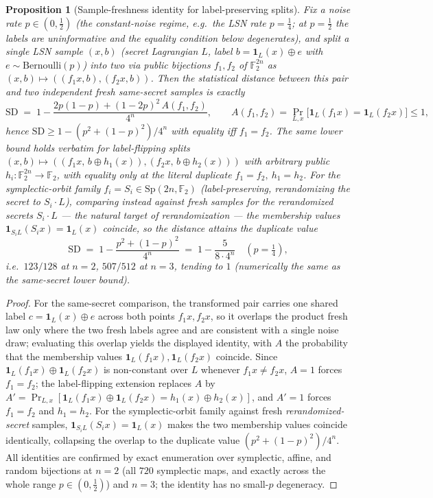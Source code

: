 \documentclass[11pt,a4paper]{article}
\theoremstyle{plain}
\newtheorem{proposition}[theorem]{Proposition}
\theoremstyle{definition}
\newcommand{\F}{\mathbb{F}}
\begin{document}
\begin{proposition}[Sample-freshness identity for label-preserving splits]
\label{prop:freshness}
Fix a noise rate $p \in (0,\tfrac12)$ (the constant-noise regime, e.g.\ the LSN rate $p=\tfrac14$; at $p=\tfrac12$ the labels are uninformative and the equality condition below degenerates), and split a single LSN sample $(x,b)$ (secret Lagrangian $L$, label $b = \mathbf 1_L(x)\oplus e$ with $e \sim \mathrm{Bernoulli}(p)$) into two via public bijections $f_1, f_2$ of $\F_2^{2n}$ as $(x,b)\mapsto((f_1 x, b),(f_2 x, b))$. Then the statistical distance between this pair and two independent fresh same-secret samples is exactly
\[
\mathrm{SD} \;=\; 1 - \frac{2p(1-p) + (1-2p)^2\,A(f_1,f_2)}{4^{n}},
\qquad A(f_1,f_2) = \Pr_{L,x}\bigl[\mathbf 1_L(f_1 x) = \mathbf 1_L(f_2 x)\bigr] \le 1,
\]
hence $\mathrm{SD} \ge 1 - (p^2+(1-p)^2)/4^n$ with equality iff $f_1 = f_2$. The same lower bound holds verbatim for label-flipping splits $(x,b)\mapsto((f_1 x,\,b\oplus h_1(x)),(f_2 x,\,b\oplus h_2(x)))$ with arbitrary public $h_i:\F_2^{2n}\to\F_2$, with equality only at the literal duplicate $f_1=f_2,\ h_1=h_2$. For the symplectic-orbit family $f_i = S_i \in \mathrm{Sp}(2n,\F_2)$ (label-preserving, rerandomizing the secret to $S_i\cdot L$), comparing instead against fresh samples \emph{for the rerandomized secrets} $S_i\cdot L$ --- the natural target of rerandomization --- the membership values $\mathbf 1_{S_iL}(S_ix)=\mathbf 1_L(x)$ coincide, so the distance attains the duplicate value
\[
\mathrm{SD} \;=\; 1 - \frac{p^2+(1-p)^2}{4^{n}} \;=\; 1 - \frac{5}{8\cdot 4^{n}} \quad (p = \tfrac14),
\]
i.e.\ $123/128$ at $n=2$, $507/512$ at $n=3$, tending to $1$ (numerically the same as the same-secret lower bound).
\end{proposition}

\begin{proof}
For the same-secret comparison, the transformed pair carries one shared label $c=\mathbf 1_L(x)\oplus e$ across both points $f_1x,f_2x$, so it overlaps the product fresh law only where the two fresh labels agree and are consistent with a single noise draw; evaluating this overlap yields the displayed identity, with $A$ the probability that the membership values $\mathbf 1_L(f_1x),\mathbf 1_L(f_2x)$ coincide. Since $\mathbf 1_L(f_1 x)\oplus\mathbf 1_L(f_2 x)$ is non-constant over $L$ whenever $f_1 x \neq f_2 x$, $A = 1$ forces $f_1 = f_2$; the label-flipping extension replaces $A$ by $A' = \Pr_{L,x}[\mathbf 1_L(f_1 x)\oplus\mathbf 1_L(f_2 x) = h_1(x)\oplus h_2(x)]$, and $A'=1$ forces $f_1=f_2$ and $h_1=h_2$. For the symplectic-orbit family against fresh \emph{rerandomized-secret} samples, $\mathbf 1_{S_iL}(S_ix)=\mathbf 1_L(x)$ makes the two membership values coincide identically, collapsing the overlap to the duplicate value $(p^2+(1-p)^2)/4^n$. All identities are confirmed by exact enumeration over symplectic, affine, and random bijections at $n=2$ (all $720$ symplectic maps, and exactly across the whole range $p\in(0,\tfrac12)$) and $n=3$; the identity has no small-$p$ degeneracy.
\end{proof}
\end{document}

